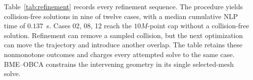 Table~\ref{tab:refinement} records every refinement sequence. The procedure yields collision-free solutions in nine of twelve cases, with a median cumulative NLP time of $0.137$~s. Cases 02, 08, 12 reach the $10M$-point cap without a collision-free solution. Refinement can remove a sampled collision, but the next optimization can move the trajectory and introduce another overlap. The table retains these nonmonotone outcomes and charges every attempted solve to the same case. BME--OBCA constrains the intervening geometry in its single selected-mesh solve.
